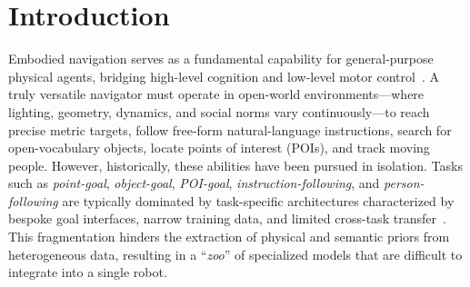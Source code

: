 \section{Introduction}
\label{sec:intro}

Embodied navigation serves as a fundamental capability for general-purpose physical agents, bridging high-level cognition and low-level motor control~\cite{anderson2018vln,gu2022vlnsurvey,hossain2026review,yang2025nav,gong2026poinavbenchmarkingenhancingfinalmeters,yang2026asyncshieldplugandplayedgeadapter,chen2026explorelikehumansautonomous,chu2026abotn0technicalreportvla,chen2026astranavworldworldmodelforesight,xiang2025navr2dualrelationreasoninggeneralizable,Liu_2026_CVPR,Chen_2026_CVPR,xue2026omninavunifiedframeworkprospective,yang2025cenavflowguidedreinforcementrefinement}. 
A truly versatile navigator must operate in open-world environments—where lighting, geometry, dynamics, and social norms vary continuously—to reach precise metric targets, follow free-form natural-language instructions, search for open-vocabulary objects, locate points of interest (POIs), and track moving people.
However, historically, these abilities have been pursued in isolation. 
Tasks such as \textit{point-goal}, \textit{object-goal}, \textit{POI-goal}, \textit{instruction-following}, and \textit{person-following} are typically dominated by task-specific architectures characterized by bespoke goal interfaces, narrow training data, and limited cross-task transfer~\cite{anderson2018vln,batra2020objectnav,krantz2020vlnce,savva2019habitat}.
This fragmentation hinders the extraction of physical and semantic priors from heterogeneous data, resulting in a ``\textit{zoo}'' of specialized models that are difficult to integrate into a single robot.


